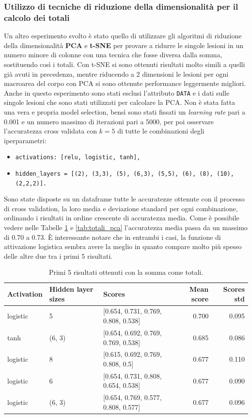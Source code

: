 \documentclass[12pt, twoside, letterpaper]{report}
\begin{document}
			\subsubsection{Utilizzo di tecniche di riduzione della dimensionalità per il calcolo dei totali} \label{par:pca_totali}
				Un altro esperimento svolto è stato quello di utilizzare gli algoritmi di riduzione della dimensionalità \textbf{PCA} e \textbf{t-SNE} per provare a ridurre le singole lesioni in un numero minore di colonne con una tecnica che fosse diversa dalla somma, sostituendo così i totali. Con t-SNE si sono ottenuti risultati molto simili a quelli già avuti in precedenza, mentre riducendo a 2 dimensioni le lesioni per ogni macroarea del corpo con PCA si sono ottenute performance leggermente migliori. Anche in questo esperimento sono stati esclusi l'attributo \texttt{DATA} e i dati sulle singole lesioni che sono stati utilizzati per calcolare la PCA. Non è stata fatta una vera e propria model selection, bensì sono stati fissati un \textit{learning rate} pari a 0.001 e un numero massimo di iterazioni pari a 5000, per poi osservare l'accuratezza cross validata con $k=5$ di tutte le combinazioni degli iperparametri: 
				\begin{itemize}
					\item \texttt{activations: [relu, logistic, tanh],}
    				\item \texttt{hidden\_layers = [(2), (3,3), (5), (6,3), (5,5), (6), (8), (10), (2,2,2)].}
				\end{itemize}
				Sono state disposte su un dataframe tutte le accuratezze ottenute con il processo di cross validation, la loro media e deviazione standard per ogni combinazione, ordinando i risultati in ordine crescente di accuratezza media. Come è possibile vedere nelle Tabelle \ref{tab:totali_somma} e \ref{tab:totali_pca} l'accuratezza media passa da un massimo di 0.70 a 0.73. È interessante notare che in entrambi i casi, la funzione di attivazione logistica sembra avere la meglio in quanto compare molto più spesso delle altre due tra i primi 5 risultati.
				\begin{table}
					\begin{tabular}{lllrr}
					\toprule
					Activation & Hidden layer sizes &                               Scores &  Mean score &  Scores std \\
					\midrule
					logistic &                  5 &  [0.654, 0.731, 0.769, 0.808, 0.538] &       0.700 &       0.095 \\
					tanh &             (6, 3) &  [0.654, 0.692, 0.769, 0.769, 0.538] &       0.685 &       0.086 \\
					logistic &                  8 &    [0.615, 0.692, 0.769, 0.808, 0.5] &       0.677 &       0.110 \\
					logistic &                  6 &  [0.654, 0.731, 0.808, 0.654, 0.538] &       0.677 &       0.090 \\
					logistic &             (6, 3) &  [0.654, 0.769, 0.577, 0.808, 0.577] &       0.677 &       0.096 \\
					\bottomrule
					\end{tabular}
					\caption{Primi 5 risultati ottenuti con la somma come totali.}
					\label{tab:totali_somma}
				\end{table}
\end{document}
